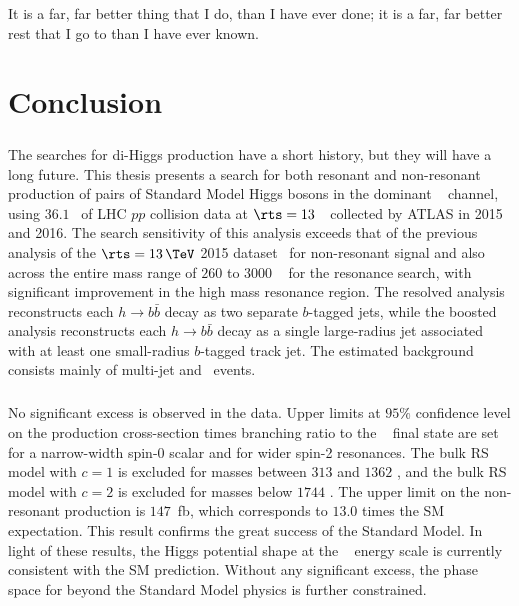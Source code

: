 \begin{savequote}[75mm]
It is a far, far better thing that I do, than I have ever done; it is a far, far better rest that I go to than I have ever known.
\end{savequote}

\chapter{Conclusion}
\label{conclusion}


\paragraph{}
The searches for di-Higgs production have a short history, but they will have a long future. 
This thesis presents a search for both resonant and non-resonant production of pairs of Standard Model Higgs bosons in the dominant \bbbb~ channel, using $36.1$ \ifb\ of LHC $pp$ collision data at $\rts = 13$~\TeV\ collected by ATLAS in 2015 and 2016. 
The search sensitivity of this analysis exceeds that of the previous analysis of the $\rts = 13\,\TeV$ 2015 dataset~\cite{EXOT-2015-11} for non-resonant signal and also across the entire mass range of $260$ to $3000$ \GeV~ for the resonance search, with significant improvement in the high mass resonance region. 
The resolved analysis reconstructs each $h \to b\bar{b}$ decay as two separate $b$-tagged jets, while the boosted analysis reconstructs each $h \to b\bar{b}$ decay as a single large-radius jet associated with at least one small-radius $b$-tagged track jet.
The estimated background consists mainly of multi-jet and \ttbar\ events.

\paragraph{}
No significant excess is observed in the data. 
Upper limits at $95\%$ confidence level on the production cross-section times branching ratio to the \bbbb~ final state are set for a narrow-width spin-0 scalar and for wider spin-2 resonances. 
The bulk RS model with $c = 1$ is excluded for masses between $313$ and $1362$ \GeV, and the bulk RS model with $c = 2$ is excluded for masses below $1744$ \GeV.
The upper limit on the non-resonant production is $147$~fb, which corresponds to $13.0$ times the SM expectation.
This result confirms the great success of the Standard Model.
In light of these results, the Higgs potential shape at the \TeV~ energy scale is currently consistent with the SM prediction.
Without any significant excess, the phase space for beyond the Standard Model physics is further constrained.

